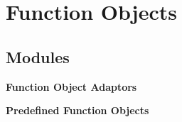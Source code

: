 \section{Function Objects}
\label{group__function__objects}
\subsection*{Modules}
\begin{CompactItemize}
\item 
{\bf Function Object Adaptors}
\item 
{\bf Predefined Function Objects}
\end{CompactItemize}
